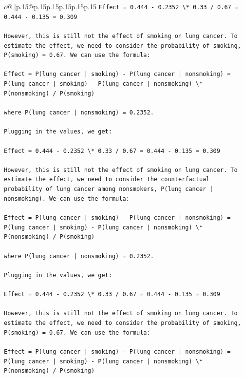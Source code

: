 \documentclass{article}
\begin{document}
{\begin{supertabular}{c@{$\;$}|p{.15\linewidth}@{}p{.15\linewidth}p{.15\linewidth}p{.15\linewidth}p{.15\linewidth}p{.15\linewidth}}
{{{\texttt{Effect = 0.444 {-} 0.2352 \textbackslash{}* 0.33 / 0.67 = 0.444 {-} 0.135 = 0.309} \\
\\ 
\texttt{However, this is still not the effect of smoking on lung cancer. To estimate the effect, we need to consider the probability of smoking, P(smoking) = 0.67. We can use the formula:} \\
\\ 
\texttt{Effect = P(lung cancer | smoking) {-} P(lung cancer | nonsmoking) = P(lung cancer | smoking) {-} P(lung cancer | nonsmoking) \textbackslash{}* P(nonsmoking) / P(smoking)} \\
\\ 
\texttt{where P(lung cancer | nonsmoking) = 0.2352.} \\
\\ 
\texttt{Plugging in the values, we get:} \\
\\ 
\texttt{Effect = 0.444 {-} 0.2352 \textbackslash{}* 0.33 / 0.67 = 0.444 {-} 0.135 = 0.309} \\
\\ 
\texttt{However, this is still not the effect of smoking on lung cancer. To estimate the effect, we need to consider the counterfactual probability of lung cancer among nonsmokers, P(lung cancer | nonsmoking). We can use the formula:} \\
\\ 
\texttt{Effect = P(lung cancer | smoking) {-} P(lung cancer | nonsmoking) = P(lung cancer | smoking) {-} P(lung cancer | nonsmoking) \textbackslash{}* P(nonsmoking) / P(smoking)} \\
\\ 
\texttt{where P(lung cancer | nonsmoking) = 0.2352.} \\
\\ 
\texttt{Plugging in the values, we get:} \\
\\ 
\texttt{Effect = 0.444 {-} 0.2352 \textbackslash{}* 0.33 / 0.67 = 0.444 {-} 0.135 = 0.309} \\
\\ 
\texttt{However, this is still not the effect of smoking on lung cancer. To estimate the effect, we need to consider the probability of smoking, P(smoking) = 0.67. We can use the formula:} \\
\\ 
\texttt{Effect = P(lung cancer | smoking) {-} P(lung cancer | nonsmoking) = P(lung cancer | smoking) {-} P(lung cancer | nonsmoking) \textbackslash{}* P(nonsmoking) / P(smoking)} \\
}}}
\end{supertabular}}
\end{document}
